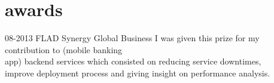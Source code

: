 \documentclass[]{friggeri-cv}
\begin{document}
\section{awards}

\begin{entrylist}
  \entry
    {\small 08-2013}
    {FLAD}
    {Synergy Global Business}
    {I was given this prize for my contribution to  (mobile banking\\
     app) backend services which consisted on reducing service downtimes,\\
     improve deployment process and giving insight on performance analysis.}
\end{entrylist}
\end{document}
